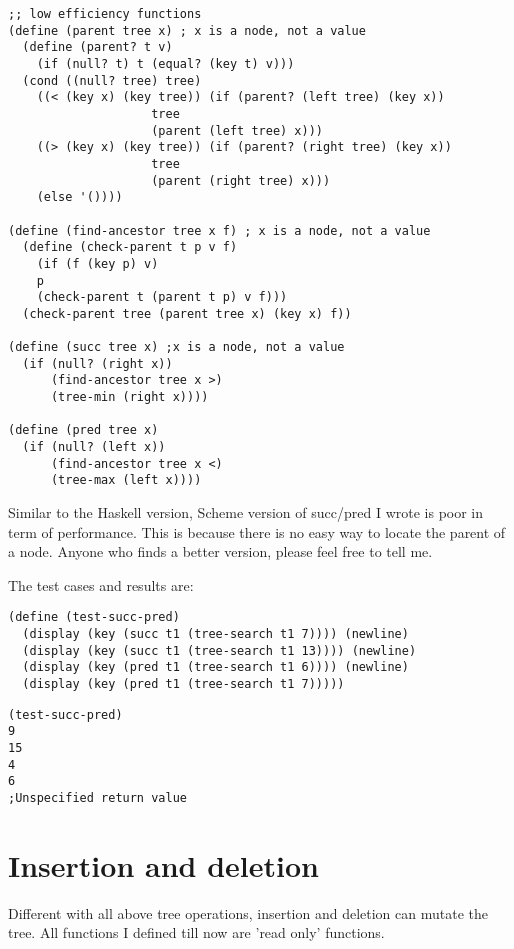 \documentclass{article}
\begin{document}
\lstset{language=lisp}
\begin{lstlisting}
;; low efficiency functions
(define (parent tree x) ; x is a node, not a value
  (define (parent? t v)
    (if (null? t) t (equal? (key t) v)))
  (cond ((null? tree) tree)
	((< (key x) (key tree)) (if (parent? (left tree) (key x))
				    tree
				    (parent (left tree) x)))
	((> (key x) (key tree)) (if (parent? (right tree) (key x))
				    tree
				    (parent (right tree) x)))
	(else '())))

(define (find-ancestor tree x f) ; x is a node, not a value
  (define (check-parent t p v f)
    (if (f (key p) v)
	p
	(check-parent t (parent t p) v f)))
  (check-parent tree (parent tree x) (key x) f))

(define (succ tree x) ;x is a node, not a value
  (if (null? (right x))
      (find-ancestor tree x >)
      (tree-min (right x))))

(define (pred tree x)
  (if (null? (left x))
      (find-ancestor tree x <)
      (tree-max (left x))))
\end{lstlisting}

Similar to the Haskell version, Scheme version of succ/pred I wrote is poor
in term of performance. This is because there is no easy way to locate the
parent of a node. Anyone who finds a better version, please feel free to 
tell me.

The test cases and results are:

\begin{lstlisting}
(define (test-succ-pred)
  (display (key (succ t1 (tree-search t1 7)))) (newline)
  (display (key (succ t1 (tree-search t1 13)))) (newline)
  (display (key (pred t1 (tree-search t1 6)))) (newline)
  (display (key (pred t1 (tree-search t1 7)))))
\end{lstlisting}

\begin{verbatim}
(test-succ-pred)
9
15
4
6
;Unspecified return value
\end{verbatim}

\section{Insertion and deletion}

Different with all above tree operations, insertion and deletion can mutate
the tree. All functions I defined till now are 'read only' functions.
\end{document}
